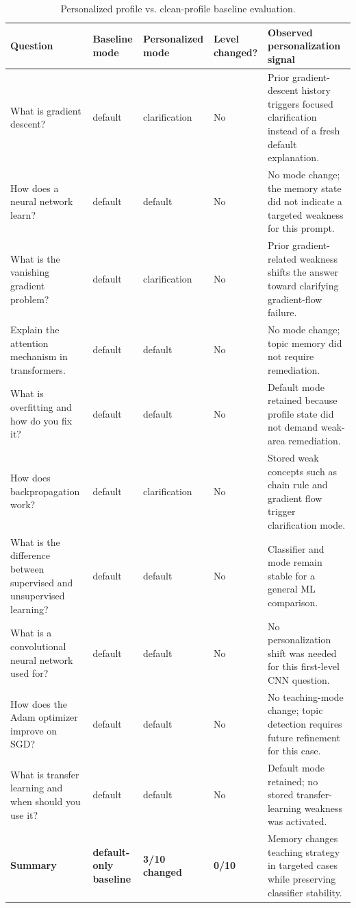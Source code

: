 \documentclass[11pt,a4paper]{article}
\begin{document}
\begin{table}[H]
\centering
\scriptsize
\begin{tabularx}{\textwidth}{>{\raggedright\arraybackslash}p{}p{}p{}p{}Y}
\toprule
\textbf{Question} & \textbf{Baseline mode} & \textbf{Personalized mode} & \textbf{Level changed?} & \textbf{Observed personalization signal} \\
\midrule
What is gradient descent? & default & clarification & No & Prior gradient-descent history triggers focused clarification instead of a fresh default explanation. \\
How does a neural network learn? & default & default & No & No mode change; the memory state did not indicate a targeted weakness for this prompt. \\
What is the vanishing gradient problem? & default & clarification & No & Prior gradient-related weakness shifts the answer toward clarifying gradient-flow failure. \\
Explain the attention mechanism in transformers. & default & default & No & No mode change; topic memory did not require remediation. \\
What is overfitting and how do you fix it? & default & default & No & Default mode retained because profile state did not demand weak-area remediation. \\
How does backpropagation work? & default & clarification & No & Stored weak concepts such as chain rule and gradient flow trigger clarification mode. \\
What is the difference between supervised and unsupervised learning? & default & default & No & Classifier and mode remain stable for a general ML comparison. \\
What is a convolutional neural network used for? & default & default & No & No personalization shift was needed for this first-level CNN question. \\
How does the Adam optimizer improve on SGD? & default & default & No & No teaching-mode change; topic detection requires future refinement for this case. \\
What is transfer learning and when should you use it? & default & default & No & Default mode retained; no stored transfer-learning weakness was activated. \\
\midrule
\textbf{Summary} & \textbf{default-only baseline} & \textbf{3/10 changed} & \textbf{0/10} & Memory changes teaching strategy in targeted cases while preserving classifier stability. \\
\bottomrule
\end{tabularx}
\caption{Personalized profile vs. clean-profile baseline evaluation.}
\label{tab:personalization-baseline}
\end{table}
\end{document}
